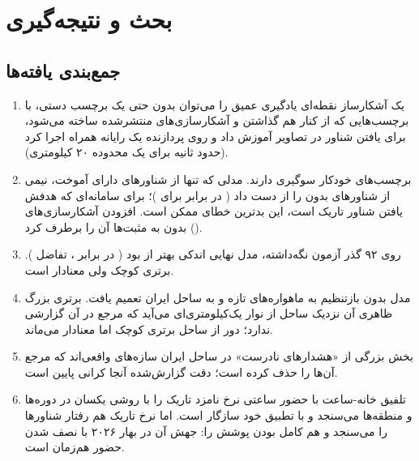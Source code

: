 \chapter{بحث و نتیجه‌گیری}
\label{ch:conclusion}

\section{جمع‌بندی یافته‌ها}
\begin{enumerate}
\item یک آشکارساز نقطه‌ای یادگیری عمیق را می‌توان بدون حتی یک برچسب دستی، با برچسب‌هایی که
از کنار هم گذاشتن  و آشکارسازی‌های منتشرشده  ساخته می‌شود، برای یافتن
شناور در تصاویر  آموزش داد و روی پردازنده یک رایانه همراه اجرا کرد (حدود
\benchSeconds{} ثانیه برای یک محدوده ۲۰ کیلومتری).
\item برچسب‌های خودکار سوگیری دارند. مدلی که تنها از شناورهای دارای  آموخت، نیمی از
شناورهای بدون  را از دست داد (\darkRecallRunOne{} در برابر \darkRecallCfar{} برای
)؛ برای سامانه‌ای که هدفش یافتن شناور تاریک است، این بدترین خطای ممکن است. افزودن
آشکارسازی‌های بدون  به مثبت‌ها آن را برطرف کرد (\darkRecallModel).
\item روی ۹۲ گذر آزمون نگه‌داشته، مدل نهایی اندکی بهتر از  بود (
\testFOneModel{} در برابر \testFOneCfar{}، تفاضل \testDiffCi). برتری کوچک ولی معنادار است.
\item مدل بدون بازتنظیم به ماهواره‌های تازه  و به ساحل ایران تعمیم یافت.
برتری بزرگ ظاهری آن نزدیک ساحل از نوار یک‌کیلومتری‌ای می‌آید که مرجع در آن گزارشی ندارد؛
دور از ساحل برتری کوچک اما معنادار می‌ماند.
\item بخش بزرگی از «هشدارهای نادرست» در ساحل ایران سازه‌های واقعی‌اند که مرجع آن‌ها را حذف
کرده است؛ دقت گزارش‌شده آنجا کرانی پایین است.
\item تلفیق خانه-ساعت با حضور ساعتی  نرخ نامزد تاریک را با روشی یکسان در دوره‌ها و
منطقه‌ها می‌سنجد و با تطبیق خود  سازگار است. اما نرخ تاریک هم رفتار شناورها را
می‌سنجد و هم کامل بودن پوشش  را: جهش آن در بهار ۲۰۲۶ با نصف شدن حضور 
هم‌زمان است.
\end{enumerate}

